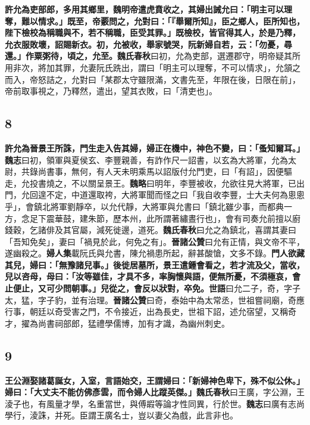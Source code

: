 \textbf{許允為吏部郎，多用其鄉里，魏明帝遣虎賁收之，其婦出誡允曰：「明主可以理奪，難以情求。」既至，帝覈問之，允對曰：「『舉爾所知』，臣之鄉人，臣所知也，陛下檢校為稱職與不，若不稱職，臣受其罪。」既檢校，皆官得其人，於是乃釋，允衣服敗壞，詔賜新衣。初，允被收，舉家號哭，阮新婦自若，云：「勿憂，尋還。」作粟粥待，頃之，允至。}{\footnotesize \textbf{魏氏春秋}曰初，允為吏部，選遷郡守，明帝疑其所用非次，將加其罪，允妻阮氏跣出，謂曰「明主可以理奪，不可以情求」，允頷之而入，帝怒詰之，允對曰「某郡太守雖限滿，文書先至，年限在後，日限在前」，帝前取事視之，乃釋然，遣出，望其衣敗，曰「清吏也」。}

\subsection*{8}

\textbf{許允為晉景王所誅，門生走入告其婦，婦正在機中，神色不變，曰：「蚤知爾耳。」}{\footnotesize \textbf{魏志}曰初，領軍與夏侯玄、李豐親善，有詐作尺一詔書，以玄為大將軍，允為太尉，共錄尚書事，無何，有人天未明乘馬以詔版付允門吏，曰「有詔」，因便驅走，允投書燒之，不以關呈景王。\textbf{魏略}曰明年，李豐被收，允欲往見大將軍，已出門，允回遑不定，中道還取袴，大將軍聞而怪之曰「我自收李豐，士大夫何為悤悤乎」，會鎮北將軍劉靜卒，以允代靜，大將軍與允書曰「鎮北雖少事，而都典一方，念足下震華鼓，建朱節，歷本州，此所謂著繡晝行也」，會有司奏允前擅以廚錢穀，乞諸俳及其官屬，減死徙邊，道死。\textbf{魏氏春秋}曰允之為鎮北，喜謂其妻曰「吾知免矣」，妻曰「禍見於此，何免之有」。\textbf{晉諸公贊}曰允有正情，與文帝不平，遂幽殺之。\textbf{婦人集}載阮氏與允書，陳允禍患所起，辭甚酸愴，文多不錄。}\textbf{門人欲藏其兒，婦曰：「無豫諸兒事。」後徙居墓所，景王遣鍾會看之，若才流及父，當收，兒以咨母，母曰：「汝等雖佳，才具不多，率胸懷與語，便無所憂，不須極哀，會止便止，又可少問朝事。」兒從之，會反以狀對，卒免。}{\footnotesize \textbf{世語}曰允二子，奇，字子太，猛，字子豹，並有治理。\textbf{晉諸公贊}曰奇，泰始中為太常丞，世祖嘗祠廟，奇應行事，朝廷以奇受害之門，不令接近，出為長史，世祖下詔，述允宿望，又稱奇才，擢為尚書祠部郎，猛禮學儒博，加有才識，為幽州刺史。}

\subsection*{9}

\textbf{王公淵娶諸葛誕女，入室，言語始交，王謂婦曰：「新婦神色卑下，殊不似公休。」婦曰：「大丈夫不能仿佛彥雲，而令婦人比蹤英傑。」}{\footnotesize \textbf{魏氏春秋}曰王廣，字公淵，王淩子也，有風量才學，名重當世，與傅嘏等論才性同異，行於世。\textbf{魏志}曰廣有志尚學行，淩誅，并死。臣謂王廣名士，豈以妻父為戲，此言非也。}

